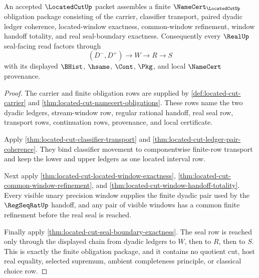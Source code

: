 \begin{theorem}
\label{thm:located-cut-real-seal-factorization-package}
An accepted $\LocatedCutUp$ packet assembles a finite
$\NameCert_{\LocatedCutUp}$ obligation package consisting of the carrier,
classifier transport, paired dyadic ledger coherence, located-window exactness,
common-window refinement, window handoff totality, and real seal-boundary
exactness. Consequently every $\RealUp$ seal-facing read factors through
$$
(D^{-},D^{+}) \longrightarrow W \longrightarrow R \longrightarrow S
$$
with its displayed $\BHist$, $\hsame$, $\Cont$, $\Pkg$, and local
$\NameCert$ provenance.
\end{theorem}
\begin{proof}
The carrier and finite obligation rows are supplied by
\autoref{def:located-cut-carrier} and
\autoref{thm:located-cut-namecert-obligations}. These rows name the two dyadic
ledgers, stream-window row, regular rational handoff, real seal row, transport
rows, continuation rows, provenance, and local certificate.

Apply \autoref{thm:located-cut-classifier-transport} and
\autoref{thm:located-cut-ledger-pair-coherence}. They bind classifier movement
to componentwise finite-row transport and keep the lower and upper ledgers as
one located interval row.

Next apply \autoref{thm:located-cut-located-window-exactness},
\autoref{thm:located-cut-common-window-refinement}, and
\autoref{thm:located-cut-window-handoff-totality}. Every visible unary
precision window supplies the finite dyadic pair used by the $\RegSeqRatUp$
handoff, and any pair of visible windows has a common finite refinement before
the real seal is reached.

Finally apply \autoref{thm:located-cut-seal-boundary-exactness}. The seal row
is reached only through the displayed chain from dyadic ledgers to $W$, then to
$R$, then to $S$. This is exactly the finite obligation package, and it contains
no quotient cut, host real equality, selected supremum, ambient completeness
principle, or classical choice row.
\end{proof}


